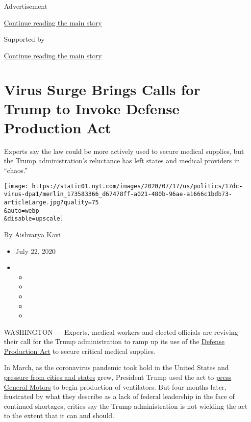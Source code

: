 Advertisement

\protect\hyperlink{after-top}{Continue reading the main story}

Supported by

\protect\hyperlink{after-sponsor}{Continue reading the main story}

\hypertarget{virus-surge-brings-calls-for-trump-to-invoke-defense-production-act}{%
\section{Virus Surge Brings Calls for Trump to Invoke Defense Production
Act}\label{virus-surge-brings-calls-for-trump-to-invoke-defense-production-act}}

Experts say the law could be more actively used to secure medical
supplies, but the Trump administration's reluctance has left states and
medical providers in ``chaos.''

\texttt{[image: https://static01.nyt.com/images/2020/07/17/us/politics/17dc-virus-dpa1/merlin\_173583366\_d67478ff-a021-480b-96ae-a1666c1bdb73-articleLarge.jpg?quality=75\\\&auto=webp\\\&disable=upscale]}

By Aishvarya Kavi

\begin{itemize}
\item
  July 22, 2020
\item
  \begin{itemize}
  \item
  \item
  \item
  \item
  \item
  \end{itemize}
\end{itemize}

WASHINGTON --- Experts, medical workers and elected officials are
reviving their call for the Trump administration to ramp up its use of
the
\href{https://www.nytimes.com/2020/03/20/us/politics/defense-production-act-virus.html}{Defense
Production Act} to secure critical medical supplies.

In March, as the coronavirus pandemic took hold in the United States and
\href{https://www.nytimes.com/2020/03/27/us/politics/coronavirus-trump-ventilators-gm-ventec.html}{pressure
from cities and states} grew, President Trump used the act to
\href{https://www.nytimes.com/2020/03/30/business/gm-ventilators-coronavirus-trump.html}{press
General Motors} to begin production of ventilators. But four months
later, frustrated by what they describe as a lack of federal leadership
in the face of continued shortages, critics say the Trump administration
is not wielding the act to the extent that it can and should.


